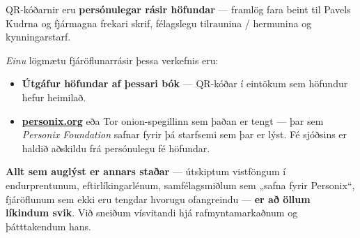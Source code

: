 \begin{minipage}[t]{0.60\textwidth}
\vspace{0pt}
\begin{mdframed}[
  linewidth=0.7pt,roundcorner=5pt,
  innerleftmargin=10pt,innerrightmargin=10pt,
  innertopmargin=8pt,innerbottommargin=8pt,
  skipabove=0pt,skipbelow=0pt,
  linecolor=cbwarning!50,backgroundcolor=cbwarning!5,
  nobreak=true,
  needspace=4\baselineskip,
]
\footnotesize
QR-kóðarnir eru \textbf{persónulegar rásir höfundar} --- framlög fara beint til Pavels Kudrna og fjármagna frekari skrif, félagslegu tilraunina / hermunina og kynningarstarf.

\smallskip
\emph{Einu} lögmætu fjáröflunarrásir þessa verkefnis eru:

\smallskip
\begin{itemize}
\setlength{\itemsep}{0pt}
\setlength{\topsep}{0pt}
\item \textbf{Útgáfur höfundar af þessari bók} --- QR-kóðar í eintökum sem höfundur hefur heimilað.
\item \href{https://personix.org}{\textbf{personix.org}} eða Tor onion-spegillinn sem þaðan er tengt --- þar sem \emph{Personix Foundation} safnar fyrir þá starfsemi sem þar er lýst. Fé sjóðsins er haldið aðskildu frá persónulegu fé höfundar.
\end{itemize}

\smallskip
\textbf{Allt sem auglýst er annars staðar} --- útskiptum vistföngum í endurprentunum, eftirlíkingarlénum, samfélagsmiðlum sem „safna fyrir Personix“, fjáröflunum sem ekki eru tengdar hvorugu ofangreindu --- \textbf{er að öllum líkindum svik}. Við sneiðum vísvitandi hjá rafmyntamarkaðnum og þátttakendum hans.
\end{mdframed}
\end{minipage}

\clearpage
